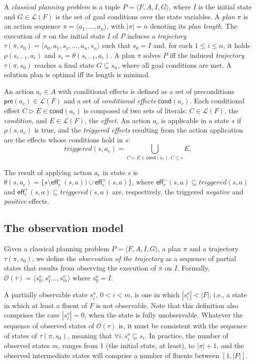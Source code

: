 \documentclass{article}
\newcommand{\tup}[1]{{\langle #1 \rangle}}
\newcommand{\pre}{\mathsf{pre}}     %
\newcommand{\eff}{\mathsf{eff}}     %
\newcommand{\cond}{\mathsf{cond}}   %
\begin{document}
A {\em classical planning problem} is a tuple $P=\tup{F,A,I,G}$, where $I$ is the initial state and $G\in\mathcal{L}(F)$ is the set of goal conditions over the state variables. A {\em plan} $\pi$ is an action sequence $\pi=\tup{a_1, \ldots, a_n}$, with $|\pi|=n$ denoting its {\em plan length}. The execution of $\pi$ on the initial state $I$ of $P$ induces a {\em trajectory} $\tau(\pi,s_0)=\tup{s_0, a_1, s_1, \ldots, a_n, s_n}$ such that $s_0=I$ and, for each {\small $1\leq i\leq n$}, it holds $\rho(s_{i-1},a_i)$ and $s_i=\theta(s_{i-1},a_i)$. A plan $\pi$ solves $P$ iff the induced {\em trajectory} $\tau(\pi,s_0)$ reaches a final state $G \subseteq s_n$, where all goal conditions are met. A solution plan is optimal iff its length is minimal.

An action $a_c\in A$ with conditional effects is defined as a set of preconditions $\pre(a_c)\in\mathcal{L}(F)$ and a set of {\em conditional effects} $\cond(a_c)$. Each conditional effect $C\rhd E\in\cond(a_c)$ is composed of two sets of literals: $C\in\mathcal{L}(F)$, the {\em condition}, and $E\in\mathcal{L}(F)$, the {\em effect}. An action $a_c$ is applicable in a state $s$ if $\rho(s,a_c)$ is true, and the {\em triggered effects} resulting from the action application are the effects whose conditions hold in $s$:
\[
triggered(s,a_c)=\bigcup_{C\rhd E\in\cond(a_c),C\subseteq s} E,
\]

The result of applying action $a_c$ in state $s$ is $\theta(s,a_c)=\{s\setminus\eff_c^-(s,a))\cup\eff_c^+(s,a)\}$, where $\eff_c^-(s,a)\subseteq triggered(s,a)$ and $\eff_c^+(s,a)\subseteq triggered(s,a)$ are, respectively, the triggered {\em negative} and {\em positive} effects.


\subsection{The observation model}
Given a classical planning problem $P=\tup{F,A,I,G}$, a plan $\pi$ and a trajectory $\tau(\pi,s_0)$, we define the \emph{observation of the trajectory} as a sequence of partial states that results from observing the execution of $\pi$ on $I$. Formally, $\mathcal{O}(\tau)=\tup{s_0^o,s_1^o \ldots , s_m^o}$ where $s_0^o=I$.

A partially observable state $s_i^o$, {\small $0<i<m$}, is one in which $|s_i^o| < |F|$; i.e., a state in which at least a fluent of $F$ is not observable. Note that this definition also comprises the case $|s_i^o| = 0$, when the state is fully unobservable. Whatever the sequence of observed states of $\mathcal{O}(\tau)$ is, it must be consistent with the sequence of states of $\tau(\pi,s_0)$, meaning that $\forall i, s_i^o \subseteq s_i$. In practice, the number of observed states $m$, ranges from 1 (the initial state, at least), to $|\pi|+1$, and the observed intermediate states will comprise a number of fluents between $[1,|F|]$.
\end{document}
